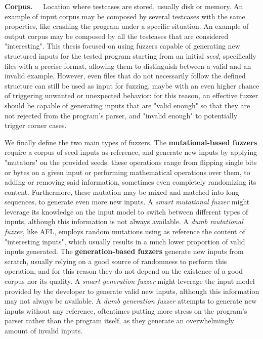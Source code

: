 \newline \newline
\textbf{Corpus.}\ \ \ Location where testcases are stored, usually disk or memory. An example of input corpus may be composed by several testcases with the same properties, like crashing the program under a specific situation. An example of output corpus may be composed by all the testcases that are considered "interesting".
\newline \newline \newline
This thesis focused on using fuzzers capable of generating new structured inputs for the tested program starting from an initial \textit{seed}, specifically files with a precise format, allowing them to distinguish between a valid and an invalid example. 
\newline
However, even files that do not necessarily follow the defined structure can still be used as input for fuzzing, maybe with an even higher chance of triggering unwanted or unexpected behavior: for this reason, an effective fuzzer should be capable of generating inputs that are "valid enough" so that they are not rejected from the program's parser, and "invalid enough" to potentially trigger corner cases.


\newpage
We finally define the two main types of fuzzers.
\newline \newline
The \textbf{mutational-based fuzzers} require a corpus of seed inputs as reference, and generate new inputs by applying "mutators" on the provided seeds: these operations range from flipping single bits or bytes on a given input or performing mathematical operations over them, to adding or removing said information, sometimes even completely randomizing its content. Furthermore, these mutation may be mixed-and-matched into long sequences, to generate even more new inputs.
\newline
A \textit{smart mutational fuzzer} might leverage its knowledge on the input model to switch between different types of inputs, although this information is not always available.
\newline
A \textit{dumb mutational fuzzer}, like AFL, employs random mutations using as reference the content of "interesting inputs", which usually results in a much lower proportion of valid inputs generated.
\newline \newline
The \textbf{generation-based fuzzers} generate new inputs from scratch, usually relying on a good source of randomness to perform this operation, and for this reason they do not depend on the existence of a good corpus nor its quality.
\newline
A \textit{smart generation fuzzer} might leverage the input model provided by the developer to generate valid new inputs, although this information may not always be available.
\newline
A \textit{dumb generation fuzzer} attempts to generate new inputs without any reference, oftentimes putting more stress on the program's parser rather than the program itself, as they generate an overwhelmingly amount of invalid inputs.



